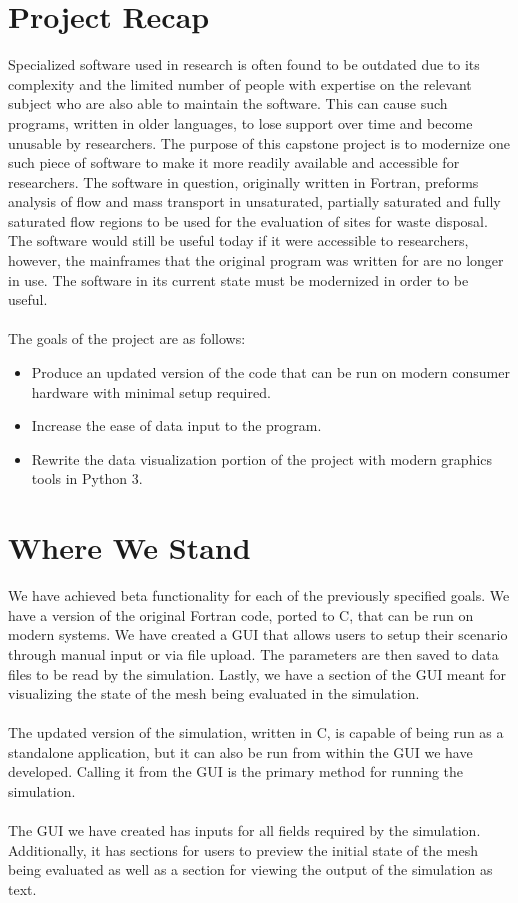 \documentclass[onecolumn, draftclsnofoot,10pt, compsoc]{IEEEtran}
\begin{document}
\section{Project Recap}
Specialized software used in research is often found to be outdated due to its complexity and the limited number of people with expertise on the relevant subject who are also able to maintain the software. This can cause such programs, written in older languages, to lose support over time and become unusable by researchers. The purpose of this capstone project is to modernize one such piece of software to make it more readily available and accessible for researchers. The software in question, originally written in Fortran, preforms analysis of flow and mass transport in unsaturated, partially saturated and fully saturated flow regions to be used for the evaluation of  sites for waste disposal. The software would still be useful today if it were accessible to researchers, however, the mainframes that the original program was written for are no longer in use. The software in its current state must be modernized in order to be useful.
\\\\
The goals of the project are as follows:
\begin{itemize}
    \item Produce an updated version of the code that can be run on modern consumer hardware with minimal setup required.
    \item Increase the ease of data input to the program.
    \item Rewrite the data visualization portion of the project with modern graphics tools in Python 3. 
\end{itemize} 
\section{Where We Stand}
We have achieved beta functionality for each of the previously specified goals. We have a version of the original Fortran code, ported to C, that can be run on modern systems. We have created a GUI that allows users to setup their scenario through manual input or via file upload. The parameters are then saved to data files to be read by the simulation. Lastly, we have a section of the GUI meant for visualizing the state of the mesh being evaluated in the simulation.\\\\
The updated version of the simulation, written in C, is capable of being run as a standalone application, but it can also be run from within the GUI we have developed. Calling it from the GUI is the primary method for running the simulation.\\\\
The GUI we have created has inputs for all fields required by the simulation. Additionally, it has sections for users to preview the initial state of the mesh being evaluated as well as a section for viewing the output of the simulation as text.
\end{document}
